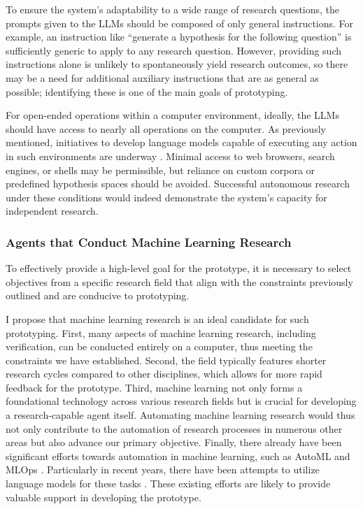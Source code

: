 \documentclass{article}
\begin{document}
To ensure the system's adaptability to a wide range of research questions, the prompts given to the LLMs should be composed of only general instructions. For example, an instruction like ``generate a hypothesis for the following question'' is sufficiently generic to apply to any research question. However, providing such instructions alone is unlikely to spontaneously yield research outcomes, so there may be a need for additional auxiliary instructions that are as general as possible; identifying these is one of the main goals of prototyping.

For open-ended operations within a computer environment, ideally, the LLMs should have access to nearly all operations on the computer. As previously mentioned, initiatives to develop language models capable of executing any action in such environments are underway \cite{openai_chatgpt_plugins_code_interpreter_2023,openinterpreter}. Minimal access to web browsers, search engines, or shells may be permissible, but reliance on custom corpora or predefined hypothesis spaces should be avoided. Successful autonomous research under these conditions would indeed demonstrate the system's capacity for independent research.

\subsubsection{Agents that Conduct Machine Learning Research}
To effectively provide a high-level goal for the prototype, it is necessary to select objectives from a specific research field that align with the constraints previously outlined and are conducive to prototyping.

I propose that machine learning research is an ideal candidate for such prototyping. First, many aspects of machine learning research, including verification, can be conducted entirely on a computer, thus meeting the constraints we have established. Second, the field typically features shorter research cycles compared to other disciplines, which allows for more rapid feedback for the prototype. Third, machine learning not only forms a foundational technology across various research fields but is crucial for developing a research-capable agent itself. Automating machine learning research would thus not only contribute to the automation of research processes in numerous other areas but also advance our primary objective. Finally, there already have been significant efforts towards automation in machine learning, such as AutoML \cite{hutter2019automated,bischl2023hyperparameter,lindauer2020best,white2023neural} and MLOps \cite{kreuzberger2023machine}. Particularly in recent years, there have been attempts to utilize language models for these tasks \cite{zheng2023can,zhang2023automl,vijay2023prompt,hollmann2023large}. These existing efforts are likely to provide valuable support in developing the prototype.
\end{document}

